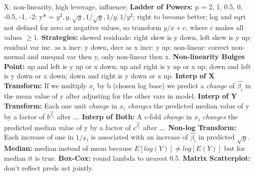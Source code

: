 \documentclass[8pt]{extarticle}
\begin{document}
X: non-linearity, high leverage, influence;
\textbf{Ladder of Powers:} p = 2, 1, 0.5, 0, -0.5, -1, -2; y* = $y^2, y,
\sqrt{y}, 1/\sqrt{y}, 1/y, 1/y^2$; right to become better; log and sqrt not
defined for zero or negative values, so transform $y/x + c$, where c makes all 
values $\geq 1$.
\textbf{Strategies:} skewed residuals: right skew is y down, left skew is y up;
residual var inc. as x incr: y down, decr as x incr: y up; non-linear: correct 
non-normal and unequal var then y, only non-linear then x.
\textbf{Non-linearity Bulges Point:} up and left is y up or x down; up and 
right is y up or x up; down and left is y down or x down; down and right is y 
down or x up.
\textbf{Interp of X Transform:} If we multiply $x_i$ by b (chosen log base) we 
predict a \textit{change} of $\hat{\beta_i}$ in the mean value of y after adjusting 
for the other vars in model.
\textbf{Interp of Y Transform:} Each one unit \textit{change} in $x_i$ \textit{changes} 
the 
predicted median value of y by a factor of $b^{\hat{\beta_i}}$ after \dots.
\textbf{Interp of Both:} A c-fold \textit{change} in $x_i$ \textit{changes} the 
predicted median 
value of y by a factor of $c^{\hat{\beta_i}}$ after \dots.
\textbf{Non-log Transform:} Each increase of one in $1/x_i$ is associated with 
an increase of $\hat{\beta_i}$ in predicted $\sqrt{y}$.
\textbf{Median:} median instead of mean because $E[log(Y)] \neq log[E(Y)]$ but 
for median it is true.
\textbf{Box-Cox:} round lambda to nearest 0.5.
\textbf{Matrix Scatterplot:} don't reflect preds act jointly.\\
\end{document}
